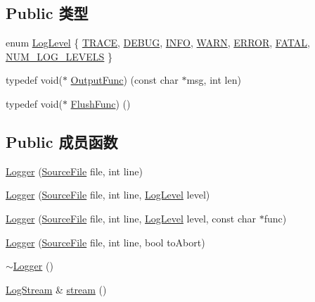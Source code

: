 \subsection*{Public 类型}
\begin{DoxyCompactItemize}
\item 
enum \hyperlink{classmuduo_1_1Logger_aca1fd1d8935433e6ba2e3918214e07f9}{Log\+Level} \{ \newline
\hyperlink{classmuduo_1_1Logger_aca1fd1d8935433e6ba2e3918214e07f9a7fa27e82c6c4f69434225ed81e5d151e}{T\+R\+A\+CE}, 
\hyperlink{classmuduo_1_1Logger_aca1fd1d8935433e6ba2e3918214e07f9a0593585da9181e972974c1274d8f2b4f}{D\+E\+B\+UG}, 
\hyperlink{classmuduo_1_1Logger_aca1fd1d8935433e6ba2e3918214e07f9a748005382152808a72b1a9177d9dc806}{I\+N\+FO}, 
\hyperlink{classmuduo_1_1Logger_aca1fd1d8935433e6ba2e3918214e07f9a74dac7ac23d5b810db6d4067f14e8676}{W\+A\+RN}, 
\newline
\hyperlink{classmuduo_1_1Logger_aca1fd1d8935433e6ba2e3918214e07f9a2fd6f336d08340583bd620a7f5694c90}{E\+R\+R\+OR}, 
\hyperlink{classmuduo_1_1Logger_aca1fd1d8935433e6ba2e3918214e07f9a651d8a47a6976d6fe05c0e03fb4cd2d0}{F\+A\+T\+AL}, 
\hyperlink{classmuduo_1_1Logger_aca1fd1d8935433e6ba2e3918214e07f9a4ffba60acdbb6fe4c6acf32b06d065d0}{N\+U\+M\+\_\+\+L\+O\+G\+\_\+\+L\+E\+V\+E\+LS}
 \}
\item 
typedef void($\ast$ \hyperlink{classmuduo_1_1Logger_a34167efc62501fda5dcd3e2c81a3497b}{Output\+Func}) (const char $\ast$msg, int len)
\item 
typedef void($\ast$ \hyperlink{classmuduo_1_1Logger_a355919f024ed4b42a85a6ddd28aede29}{Flush\+Func}) ()
\end{DoxyCompactItemize}
\subsection*{Public 成员函数}
\begin{DoxyCompactItemize}
\item 
\hyperlink{classmuduo_1_1Logger_a16db484462eb24f5c3bfb697fcf47175}{Logger} (\hyperlink{classmuduo_1_1Logger_1_1SourceFile}{Source\+File} file, int line)
\item 
\hyperlink{classmuduo_1_1Logger_aa956cff693fd7f5b5e27f80161d7064f}{Logger} (\hyperlink{classmuduo_1_1Logger_1_1SourceFile}{Source\+File} file, int line, \hyperlink{classmuduo_1_1Logger_aca1fd1d8935433e6ba2e3918214e07f9}{Log\+Level} level)
\item 
\hyperlink{classmuduo_1_1Logger_a62af35d852c8b5642f517f5c07740cc0}{Logger} (\hyperlink{classmuduo_1_1Logger_1_1SourceFile}{Source\+File} file, int line, \hyperlink{classmuduo_1_1Logger_aca1fd1d8935433e6ba2e3918214e07f9}{Log\+Level} level, const char $\ast$func)
\item 
\hyperlink{classmuduo_1_1Logger_a267d5d8e87b3c87a06cde3e8d6f5e8ee}{Logger} (\hyperlink{classmuduo_1_1Logger_1_1SourceFile}{Source\+File} file, int line, bool to\+Abort)
\item 
\hyperlink{classmuduo_1_1Logger_a0d77f27eb95c246d555904aaf08018eb}{$\sim$\+Logger} ()
\item 
\hyperlink{classmuduo_1_1LogStream}{Log\+Stream} \& \hyperlink{classmuduo_1_1Logger_af35f1ce6f7021612044983efed7fc89e}{stream} ()
\end{DoxyCompactItemize}
